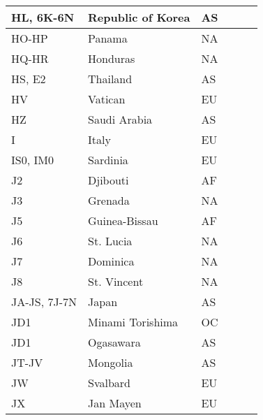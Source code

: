 \documentclass[a4paper]{article}
\begin{document}
\begin{longtable}{|p{1.5cm}|p{4cm}|l|p{2cm}|p{2cm}|p{2cm}|}
\hline
HL, 6K-6N              & Republic of Korea                          & AS    & & & \\
\hline
HO-HP                  & Panama                                     & NA    & & & \\
\hline
HQ-HR                  & Honduras                                   & NA    & & & \\
\hline
HS, E2                 & Thailand                                   & AS    & & & \\
\hline
HV                     & Vatican                                    & EU    & & & \\
\hline
HZ                     & Saudi Arabia                               & AS    & & & \\
\hline
I                      & Italy                                      & EU    & & & \\
\hline
IS0, IM0               & Sardinia                                   & EU    & & & \\
\hline
J2                     & Djibouti                                   & AF    & & & \\
\hline
J3                     & Grenada                                    & NA    & & & \\
\hline
J5                     & Guinea-Bissau                              & AF    & & & \\
\hline
J6                     & St. Lucia                                  & NA    & & & \\
\hline
J7                     & Dominica                                   & NA    & & & \\
\hline
J8                     & St. Vincent                                & NA    & & & \\
\hline
JA-JS, 7J-7N           & Japan                                      & AS    & & & \\
\hline
JD1                    & Minami Torishima                           & OC    & & & \\
\hline
JD1                    & Ogasawara                                  & AS    & & & \\
\hline
JT-JV                  & Mongolia                                   & AS    & & & \\
\hline
JW                     & Svalbard                                   & EU    & & & \\
\hline
JX                     & Jan Mayen                                  & EU    & & & \\

\end{longtable}
\end{document}
